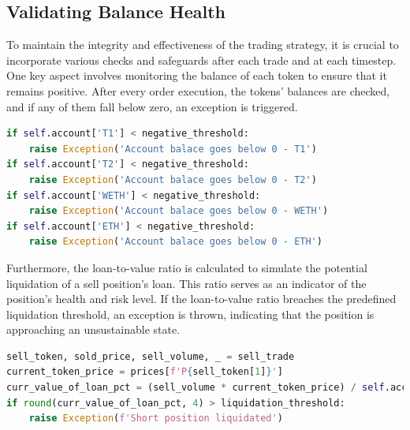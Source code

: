 \subsection{Validating Balance Health}
To maintain the integrity and effectiveness of the trading strategy, it is crucial to incorporate various checks and safeguards after each trade and at each timestep. One key aspect involves monitoring the balance of each token to ensure that it remains positive. After every order execution, the tokens' balances are checked, and if any of them fall below zero, an exception is triggered.
\begin{lstlisting}[language=Python]
if self.account['T1'] < negative_threshold:
    raise Exception('Account balace goes below 0 - T1')
if self.account['T2'] < negative_threshold:
    raise Exception('Account balace goes below 0 - T2')
if self.account['WETH'] < negative_threshold:
    raise Exception('Account balace goes below 0 - WETH')
if self.account['ETH'] < negative_threshold:
    raise Exception('Account balace goes below 0 - ETH')
\end{lstlisting}
Furthermore, the loan-to-value ratio is calculated to simulate the potential liquidation of a sell position's loan. This ratio serves as an indicator of the position's health and risk level. If the loan-to-value ratio breaches the predefined liquidation threshold, an exception is thrown, indicating that the position is approaching an unsustainable state.
\begin{lstlisting}[language=Python]
sell_token, sold_price, sell_volume, _ = sell_trade
current_token_price = prices[f'P{sell_token[1]}']
curr_value_of_loan_pct = (sell_volume * current_token_price) / self.account['collateral_WETH']
if round(curr_value_of_loan_pct, 4) > liquidation_threshold:
    raise Exception(f'Short position liquidated')
\end{lstlisting}


